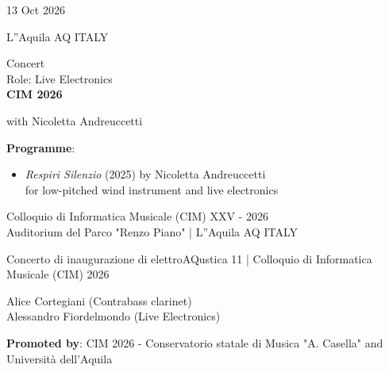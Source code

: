 \documentclass[7pt,a4paper]{article}
\begin{document}
\begin{mdframed}[
    backgroundcolor=entrygray,
    linecolor=entrygray,
    linewidth=0pt,
    innerleftmargin=6pt,
    innerrightmargin=6pt,
    innertopmargin=6pt,
    innerbottommargin=6pt,
    skipabove=0pt,
    skipbelow=0pt
]

\begin{minipage}[t]{0.28\textwidth}

13 Oct 2026

\scriptsize L''Aquila AQ ITALY


\end{minipage}
\begin{minipage}[t]{0.68\textwidth}
\small Concert
\\\scriptsize Role: Live Electronics
\\ \normalsize \textbf{CIM 2026}

\par\scriptsize with Nicoletta Andreuccetti
\vspace{0.25cm}

\par \scriptsize \textbf{Programme}:\par
\begin{itemize}

\item \textit{Respiri Silenzio} (2025) by Nicoletta Andreuccetti\\ for low-pitched wind instrument and live electronics

\end{itemize}
\vspace{0.2cm}



\small Colloquio di Informatica Musicale (CIM) XXV - 2026\\Auditorium del Parco "Renzo Piano" | \scriptsize L''Aquila AQ ITALY

\vspace{0.1cm}
\scriptsize

Concerto di inaugurazione di elettroAQustica 11 | Colloquio di Informatica Musicale (CIM) 2026\par\vspace{2mm}Alice Cortegiani (Contrabass clarinet)\\Alessandro Fiordelmondo (Live Electronics)

\vspace{0.1cm}
\par \textbf{Promoted by}: CIM 2026 - Conservatorio statale di Musica "A. Casella" and Università dell'Aquila
\end{minipage}
\vspace{0.25cm}
\end{mdframed}
\end{document}

